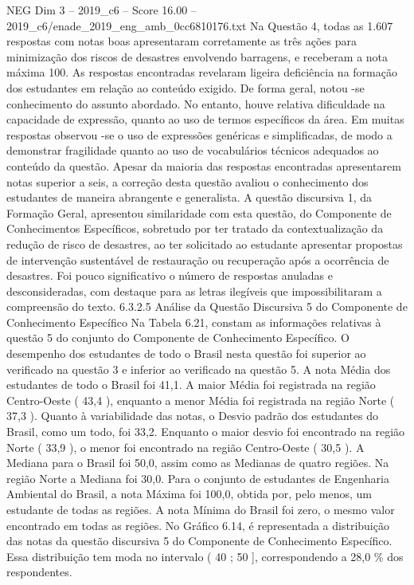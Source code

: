 \begin{textsample}{NEG Dim 3 – 2019\_c6 – Score 16.00 – 2019\_c6/enade\_2019\_eng\_amb\_0cc6810176.txt}
Na Questão 4, todas as 1.607 respostas com notas boas apresentaram corretamente as três ações para minimização dos riscos de desastres envolvendo barragens, e receberam a nota máxima 100.
As respostas encontradas revelaram ligeira deficiência na formação dos estudantes em relação ao conteúdo exigido.
De forma geral, notou -se conhecimento do assunto abordado.
No entanto, houve relativa dificuldade na capacidade de expressão, quanto ao uso de termos específicos da área.
Em muitas respostas observou -se o uso de expressões genéricas e simplificadas, de modo a demonstrar fragilidade quanto ao uso de vocabulários técnicos adequados ao conteúdo da questão.
Apesar da maioria das respostas encontradas apresentarem notas superior a seis, a correção desta questão avaliou o conhecimento dos estudantes de maneira abrangente e generalista.
A questão discursiva 1, da Formação Geral, apresentou similaridade com esta questão, do Componente de Conhecimentos Específicos, sobretudo por ter tratado da contextualização da redução de risco de desastres, ao ter solicitado ao estudante apresentar propostas de intervenção sustentável de restauração ou recuperação após a ocorrência de desastres.
Foi pouco significativo o número de respostas anuladas e desconsideradas, com destaque para as letras ilegíveis que impossibilitaram a compreensão do texto. 6.3.2.5 Análise da Questão Discursiva 5 do Componente de Conhecimento Específico Na Tabela 6.21, constam as informações relativas à questão 5 do conjunto do Componente de Conhecimento Específico.
O desempenho dos estudantes de todo o Brasil nesta questão foi superior ao verificado na questão 3 e inferior ao verificado na questão 5.
A nota Média dos estudantes de todo o Brasil foi 41,1.
A maior Média foi registrada na região Centro-Oeste ( 43,4 ), enquanto a menor Média foi registrada na região Norte ( 37,3 ).
Quanto à variabilidade das notas, o Desvio padrão dos estudantes do Brasil, como um todo, foi 33,2.
Enquanto o maior desvio foi encontrado na região Norte ( 33,9 ), o menor foi encontrado na região Centro-Oeste ( 30,5 ).
A Mediana para o Brasil foi 50,0, assim como as Medianas de quatro regiões.
Na região Norte a Mediana foi 30,0.
Para o conjunto de estudantes de Engenharia Ambiental do Brasil, a nota Máxima foi 100,0, obtida por, pelo menos, um estudante de todas as regiões.
A nota Mínima do Brasil foi zero, o mesmo valor encontrado em todas as regiões.
No Gráfico 6.14, é representada a distribuição das notas da questão discursiva 5 do Componente de Conhecimento Específico.
Essa distribuição tem moda no intervalo ( 40 ; 50 ], correspondendo a 28,0 \% dos respondentes.

\end{textsample}
